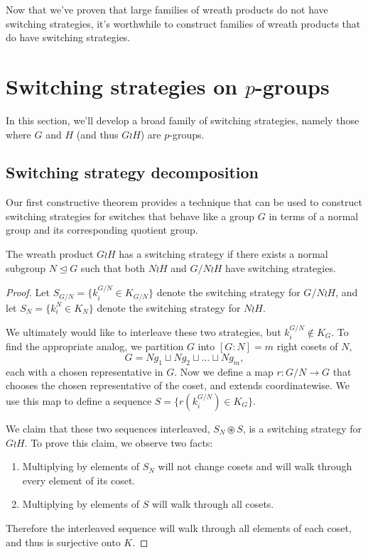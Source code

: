 Now that we've proven that large families of wreath products do not have
switching strategies, it's worthwhile to construct families of wreath products
that do have switching strategies.
%
%
\section{Switching strategies on \texorpdfstring{$p$}{p}-groups}
\label{sec:pGroupStrategy}
In this section, we'll develop a broad family of switching strategies,
namely those where $G$ and $H$ (and thus $G \wr H$) are $p$-groups.
\subsection{Switching strategy decomposition}

Our first constructive theorem provides a technique that can be used to
construct switching strategies for switches that behave like a group $G$ in
terms of a normal group and its corresponding quotient group.
\begin{theorem}
  The wreath product $G \wr H$ has a switching strategy if there exists a
  normal subgroup $N \trianglelefteq G$ such that both $N \wr H$ and
  $G/N \wr H$ have switching strategies.
\label{thm:switchingStrategyDecomposition}
\end{theorem}
\begin{proof}
  Let $S_{G/N} = \{k_i^{G/N} \in K_{G/N}\}$ denote the switching strategy for
  $G/N \wr H$, and
  let $S_{N} = \{k_i^N \in K_{N}\}$ denote the switching strategy for $N \wr H$.

  We ultimately would like to interleave these two strategies,
  but $k_i^{G/N} \not\in K_G$. To find the appropriate analog,
  we partition $G$ into $[G : N] = m$ right cosets of $N$, \begin{equation}
    G = Ng_1 \sqcup Ng_2 \sqcup \dots \sqcup Ng_m,
  \end{equation} each with a chosen representative in $G$.
  Now we define a map $r \colon G/N \rightarrow G$ that chooses the chosen
  representative of the coset, and extends coordinatewise. We use this map to
  define a sequence $S = \{r(k_i^{G/N}) \in K_G\}$.

  We claim that these two sequences interleaved, $S_N \circledast S$, is a
  switching strategy for $G \wr H$. To prove this claim, we observe two facts:
  \begin{enumerate}
    \item Multiplying by elements of $S_N$ will not change cosets and will walk
    through every element of its coset.
    \item Multiplying by elements of $S$ will walk through all cosets.
  \end{enumerate}
  Therefore the interleaved sequence will walk through all elements of each
  coset, and thus is surjective onto $K$.
\end{proof}

